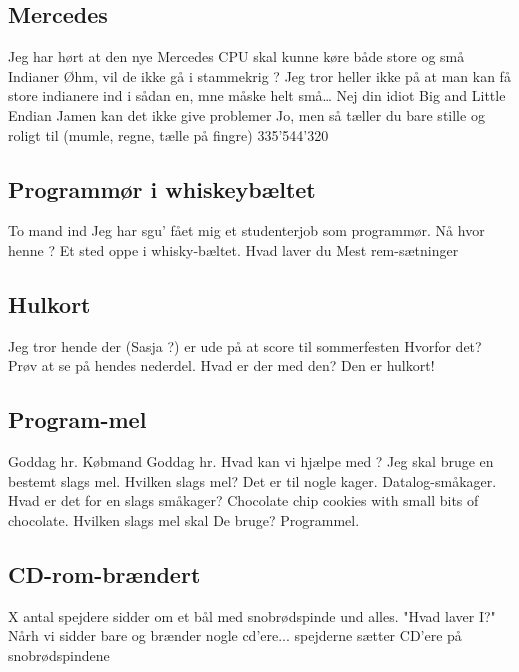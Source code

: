 \documentclass[danish]{article}
\begin{document}
\begin{sketch}
\subsection*{Mercedes}
 Jeg har hørt at den nye Mercedes CPU skal kunne køre både store og små Indianer
 Øhm, vil de ikke gå i stammekrig ? Jeg tror heller ikke på at man kan få store
indianere ind i sådan en, mne måske helt små\ldots
{} Nej din idiot Big and Little Endian
 Jamen kan det ikke give problemer
 Jo, men så tæller du bare stille og roligt til (mumle, regne, tælle på fingre) 335'544'320


\subsection*{Programmør i whiskeybæltet}
\scene To mand ind
 Jeg har sgu' fået mig et studenterjob som programmør.
 Nå hvor henne ?
 Et sted oppe i whisky-bæltet.
 Hvad laver du
 Mest rem-sætninger


\subsection*{Hulkort}
 Jeg tror hende der (Sasja ?) er ude på at score til sommerfesten
 Hvorfor det?
 Prøv at se på hendes nederdel.
 Hvad er der med den?
 Den er hulkort!


\subsection*{Program-mel}
 Goddag hr. Købmand
 Goddag hr. Hvad kan vi hjælpe med ?
 Jeg skal bruge en bestemt slags mel.
 Hvilken slags mel?
 Det er til nogle kager. Datalog-småkager.
 Hvad er det for en slags småkager?
 Chocolate chip cookies with small bits of chocolate.
 Hvilken slags mel skal De bruge?
 Programmel.



\subsection*{CD-rom-brændert}
\scene X antal spejdere sidder om et bål med snobrødspinde und alles.
 "Hvad laver I?"
 Nårh vi sidder bare og brænder nogle cd'ere...
\scene spejderne sætter CD'ere på snobrødspindene



\end{sketch}
\end{document}
